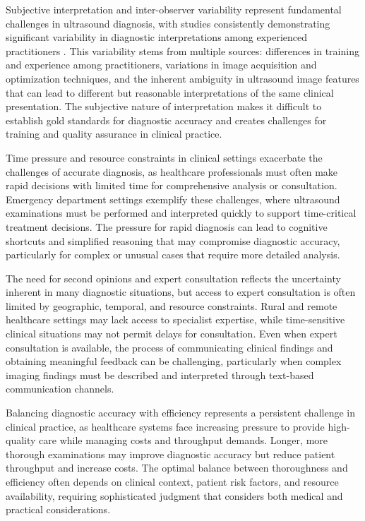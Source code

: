 Subjective interpretation and inter-observer variability represent fundamental challenges in ultrasound diagnosis, with studies consistently demonstrating significant variability in diagnostic interpretations among experienced practitioners \cite{abramowicz2013benefits}. This variability stems from multiple sources: differences in training and experience among practitioners, variations in image acquisition and optimization techniques, and the inherent ambiguity in ultrasound image features that can lead to different but reasonable interpretations of the same clinical presentation. The subjective nature of interpretation makes it difficult to establish gold standards for diagnostic accuracy and creates challenges for training and quality assurance in clinical practice.

Time pressure and resource constraints in clinical settings exacerbate the challenges of accurate diagnosis, as healthcare professionals must often make rapid decisions with limited time for comprehensive analysis or consultation. Emergency department settings exemplify these challenges, where ultrasound examinations must be performed and interpreted quickly to support time-critical treatment decisions. The pressure for rapid diagnosis can lead to cognitive shortcuts and simplified reasoning that may compromise diagnostic accuracy, particularly for complex or unusual cases that require more detailed analysis.

The need for second opinions and expert consultation reflects the uncertainty inherent in many diagnostic situations, but access to expert consultation is often limited by geographic, temporal, and resource constraints. Rural and remote healthcare settings may lack access to specialist expertise, while time-sensitive clinical situations may not permit delays for consultation. Even when expert consultation is available, the process of communicating clinical findings and obtaining meaningful feedback can be challenging, particularly when complex imaging findings must be described and interpreted through text-based communication channels.

Balancing diagnostic accuracy with efficiency represents a persistent challenge in clinical practice, as healthcare systems face increasing pressure to provide high-quality care while managing costs and throughput demands. Longer, more thorough examinations may improve diagnostic accuracy but reduce patient throughput and increase costs. The optimal balance between thoroughness and efficiency often depends on clinical context, patient risk factors, and resource availability, requiring sophisticated judgment that considers both medical and practical considerations.

